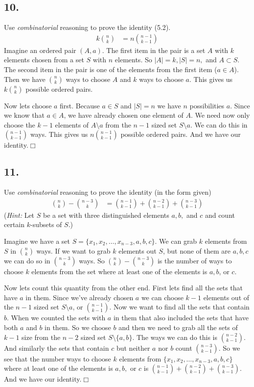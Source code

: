 \documentclass{article}
\begin{document}
\subsection*{10.}
Use \emph{combinatorial} reasoning to prove the identity (5.2).
\begin{align*}
  k\binom{n}{k}&=n\binom{n-1}{k-1}
\end{align*}
Imagine an ordered pair $(A,a)$. The first item in the pair is a set $A$ with $k$ elements chosen from a set $S$ with $n$ elements. So $\lvert A\rvert=k, \lvert S\rvert=n,$ and $A\subset S$. The second item in the pair is one of the elements from the first item ($a\in A$). Then we have $\binom{n}{k}$ ways to choose $A$ and $k$ ways to choose $a$. This gives us $k\binom{n}{k}$ possible ordered pairs.

Now lets choose $a$ first. Because $a\in S$ and $\lvert S\rvert=n$ we have $n$ possibilities $a$. Since we know that $a\in A$, we have already chosen one element of $A$. We need now only choose the $k-1$ elements of $A\setminus a$ from the $n-1$ sized set $S\setminus a$. We can do this in $\binom{n-1}{k-1}$ ways. This gives us $n\binom{n-1}{k-1}$ possible ordered pairs. And we have our identity.$\Box$
\subsection*{11.}
Use \emph{combinatorial} reasoning to prove the identity (in the form given)
\begin{align*}
  \binom{n}{k}-\binom{n-3}{k}&=\binom{n-1}{k-1}+\binom{n-2}{k-1}+\binom{n-3}{k-1}
\end{align*}
(\emph{Hint:} Let $S$ be a set with three distinguished elements $a, b,$ and $c$ and count certain $k$-subsets of $S$.)

Imagine we have a set $S=\{x_1,x_2,\dots,x_{n-3},a,b,c\}$. We can grab $k$ elements from $S$ in $\binom{n}{k}$ ways. If we want to grab $k$ elements out $S$, but none of them are $a,b,c$ we can do so in $\binom{n-3}{k}$ ways. So $\binom{n}{k}-\binom{n-3}{k}$ is the number of ways to choose $k$ elements from the set where at least one of the elements is $a,b$, or $c$.

Now lets count this quantity from the other end. First lets find all the sets that have $a$ in them. Since we've already chosen $a$ we can choose $k-1$ elements out of the $n-1$ sized set $S\setminus a$, or $\binom{n-1}{k-1}$. Now we want to find all the sets that contain $b$. When we counted the sets with $a$ in them that also included the sets that have both $a$ and $b$ in them. So we choose $b$ and then we need to grab all the sets of $k-1$ size from the $n-2$ sized set $S\setminus\{a,b\}$. The ways we can do this is $\binom{n-2}{k-1}$. And similarly the sets that contain $c$ but neither $a$ nor $b$ count $\binom{n-3}{k-1}$. So we see that the number ways to choose $k$ elements from $\{x_1,x_2,\dots,x_{n-3},a,b,c\}$ where at least one of the elements is $a,b,$ or $c$ is $\binom{n-1}{k-1}+\binom{n-2}{k-1}+\binom{n-3}{k-1}$. And we have our identity.$\Box$
\end{document}
